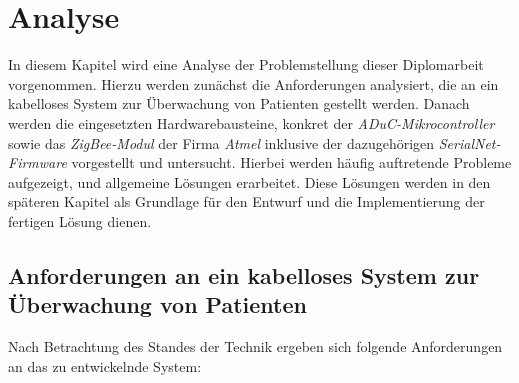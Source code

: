\chapter{Analyse}\label{Analyse}

In diesem Kapitel wird eine Analyse der Problemstellung dieser Diplomarbeit vorgenommen. Hierzu 
werden zunächst die Anforderungen analysiert, die an ein kabelloses System zur Überwachung von 
Patienten gestellt werden. Danach werden die eingesetzten Hardwarebausteine, konkret der
\emph{ADuC-Mikrocontroller} sowie das \emph{ZigBee-Modul} der Firma \emph{Atmel} 
inklusive der dazugehörigen \emph{SerialNet-Firmware} vorgestellt und untersucht. Hierbei 
werden häufig auftretende Probleme aufgezeigt, und allgemeine Lösungen erarbeitet. Diese
Lösungen werden in den späteren Kapitel als Grundlage für den Entwurf und die Implementierung
der fertigen Lösung dienen.

\section{Anforderungen an ein kabelloses System zur Überwachung von Patienten}\label{Anforderungen}
    Nach Betrachtung des Standes der Technik ergeben sich folgende Anforderungen
    an das zu entwickelnde System:
    
